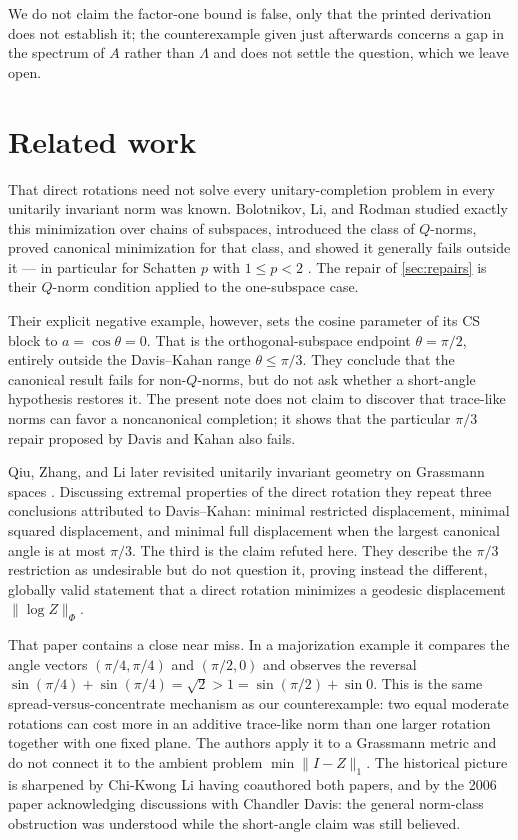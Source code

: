 \documentclass[11pt]{article}
\theoremstyle{definition}
\begin{document}
We do not claim the factor-one bound is false, only that the printed derivation
does not establish it; the counterexample given just afterwards concerns a gap
in the spectrum of $A$ rather than $\Lambda$ and does not settle the question,
which we leave open.

\section{Related work}
\label{sec:related}

That direct rotations need not solve every unitary-completion problem in every
unitarily invariant norm was known.  Bolotnikov, Li, and Rodman studied exactly
this minimization over chains of subspaces, introduced the class of $Q$-norms,
proved canonical minimization for that class, and showed it generally fails
outside it --- in particular for Schatten $p$ with $1\leq p<2$
\cite{BolotnikovLiRodman2001}.  The repair of \cref{sec:repairs} is their
$Q$-norm condition applied to the one-subspace case.

Their explicit negative example, however, sets the cosine parameter of its CS
block to $a=\cos\theta=0$.  That is the orthogonal-subspace endpoint
$\theta=\pi/2$, entirely outside the Davis--Kahan range $\theta\leq\pi/3$.  They
conclude that the canonical result fails for non-$Q$-norms, but do not ask
whether a short-angle hypothesis restores it.  The present note does not claim
to discover that trace-like norms can favor a noncanonical completion; it shows
that the particular $\pi/3$ repair proposed by Davis and Kahan also fails.

Qiu, Zhang, and Li later revisited unitarily invariant geometry on Grassmann
spaces \cite{QiuZhangLi2006}.  Discussing extremal properties of the direct
rotation they repeat three conclusions attributed to Davis--Kahan: minimal
restricted displacement, minimal squared displacement, and minimal full
displacement when the largest canonical angle is at most $\pi/3$.  The third is
the claim refuted here.  They describe the $\pi/3$ restriction as undesirable
but do not question it, proving instead the different, globally valid statement
that a direct rotation minimizes a geodesic displacement
$\lVert\log Z\rVert_\Phi$.

That paper contains a close near miss.  In a majorization example it compares
the angle vectors $(\pi/4,\pi/4)$ and $(\pi/2,0)$ and observes the reversal
$\sin(\pi/4)+\sin(\pi/4)=\sqrt2>1=\sin(\pi/2)+\sin 0$.  This is the same
spread-versus-concentrate mechanism as our counterexample: two equal moderate
rotations can cost more in an additive trace-like norm than one larger rotation
together with one fixed plane.  The authors apply it to a Grassmann metric and
do not connect it to the ambient problem $\min\lVert I-Z\rVert_1$.  The
historical picture is sharpened by Chi-Kwong Li having coauthored both papers,
and by the 2006 paper acknowledging discussions with Chandler Davis: the
general norm-class obstruction was understood while the short-angle claim was
still believed.
\end{document}
